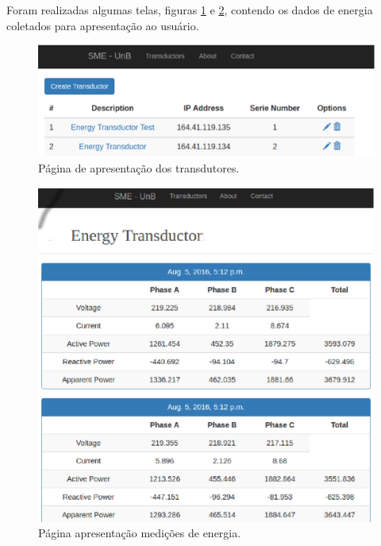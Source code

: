 \vfill
\pagebreak

Foram realizadas algumas telas, figuras \ref{dados02} e \ref{dados01}, contendo os dados de energia coletados para apresentação ao usuário.

\begin{figure}[!htpb]
    \centering
    \includegraphics[keepaspectratio=true,scale=0.5]{figuras/coleta_dados_02.eps}
    \caption{Página de apresentação dos transdutores.}
    \label{dados02}
\end{figure}

\begin{figure}[!htpb]
    \centering
    \includegraphics[keepaspectratio=true,scale=0.5]{figuras/coleta_dados_01.eps}
    \caption{Página apresentação medições de energia.}
    \label{dados01}
\end{figure}

\vfill
\pagebreak

